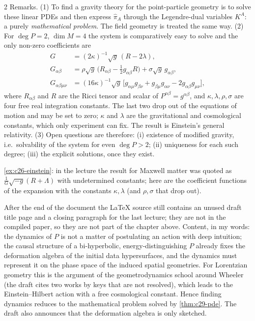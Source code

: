 \begin{paracol}{2}
Remarks. (1) To find a gravity theory for the point-particle geometry is to solve these linear PDEs and then express $\hat\pi_A$ through the Legendre-dual variables $K^A$: a purely \emph{mathematical problem}. The field geometry is treated the same way. (2) For $\deg P=2$, $\dim M=4$ the system is comparatively easy to solve and the only non-zero coefficients are
\begin{align*}
  G&=(2\kappa)^{-1}\sqrt g\,(R-2\lambda),\\
  G_{\alpha\beta}&=\rho\sqrt g\,\bigl(R_{\alpha\beta}-\tfrac12g_{\alpha\beta}R\bigr)+\sigma\sqrt g\,g_{\alpha\beta},\\
  G_{\alpha\beta\mu\nu}&=(16\kappa)^{-1}\sqrt g\,\bigl[g_{\alpha\mu}g_{\beta\nu}+g_{\beta\mu}g_{\alpha\nu}-2g_{\alpha\beta}g_{\mu\nu}\bigr],
\end{align*}
where $R_{\alpha\beta}$ and $R$ are the Ricci tensor and scalar of $P^{\alpha\beta}=g^{\alpha\beta}$, and $\kappa,\lambda,\rho,\sigma$ are four free real integration constants. The last two drop out of the equations of motion and may be set to zero; $\kappa$ and $\lambda$ are the gravitational and cosmological constants, which only experiment can fix. The result is Einstein's general relativity. (3) Open questions are therefore: (i) existence of modified gravity, i.e.\ solvability of the system for even $\deg P>2$; (ii) uniqueness for each such degree; (iii) the explicit solutions, once they exist.
\begin{recall}
\cref{ex:c26-einstein}: in the lecture the result for Maxwell matter was quoted as $\frac1G\sqrt{-g}(R+\Lambda)$ with undetermined constants; here are the coefficient functions of the expansion with the constants $\kappa,\lambda$ (and $\rho,\sigma$ that drop out).
\end{recall}

\begin{coursenote}
After the end of the document the LaTeX source still contains an unused draft title page and a closing paragraph for the last lecture; they are not in the compiled paper, so they are not part of the chapter above. Content, in my words: the dynamics of $P$ is not a matter of postulating an action with deep intuition; the causal structure of a bi-hyperbolic, energy-distinguishing $P$ already fixes the deformation algebra of the initial data hypersurfaces, and the dynamics must represent it on the phase space of the induced spatial geometries. For Lorentzian geometry this is the argument of the geometrodynamics school around Wheeler (the draft cites two works by keys that are not resolved), which leads to the Einstein--Hilbert action with a free cosmological constant. Hence finding dynamics reduces to the mathematical problem solved by \cref{thm:c29-pde}. The draft also announces that the deformation algebra is only sketched.
\end{coursenote}


\end{paracol}
